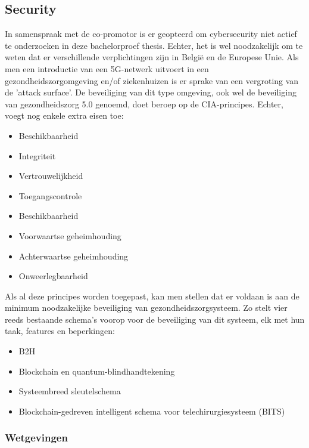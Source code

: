 \subsection{Security}
In samenspraak met de co-promotor is er geopteerd om cybersecurity niet actief te onderzoeken in deze bachelorproef thesis. Echter, het is wel noodzakelijk om te weten dat er verschillende verplichtingen zijn in België en de Europese Unie. Als men een introductie van een 5G-netwerk uitvoert in een gezondheidszorgomgeving en/of ziekenhuizen is er sprake van een vergroting van  de 'attack surface'. De beveiliging van dit type omgeving, ook wel de beveiliging van gezondheidszorg 5.0 genoemd, doet beroep op de CIA-principes. Echter, \textcite{Wazid2022} voegt nog enkele extra eisen toe:

\begin{itemize}
  \item Beschikbaarheid
  \item Integriteit
  \item Vertrouwelijkheid
  \item Toegangscontrole
  \item Beschikbaarheid
  \item Voorwaartse geheimhouding
  \item Achterwaartse geheimhouding
  \item Onweerlegbaarheid
\end{itemize}

Als al deze principes worden toegepast, kan men stellen dat er voldaan is aan de minimum noodzakelijke beveiliging van gezondheidszorgsysteem. Zo stelt \textcite{Wazid2022} vier reeds bestaande schema's voorop voor de beveiliging van dit systeem, elk met hun taak, features en beperkingen:

\begin{itemize}
  \item B2H \autocite{Ghosh2022}
  \item Blockchain en quantum-blindhandtekening \autocite{Bhavin2021}
  \item Systeembreed sleutelschema \autocite{Chang2022}
  \item Blockchain-gedreven intelligent schema voor telechirurgiesysteem (BITS) \autocite{Gupta2020}
\end{itemize}

\subsubsection{Wetgevingen}

